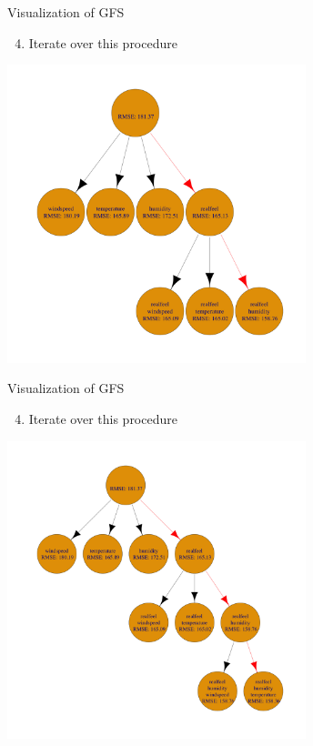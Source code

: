 \documentclass[11pt,compress,t,notes=noshow, xcolor=table]{beamer}
\begin{document}
\begin{frame}[noframenumbering]{Visualization of GFS}    
\begin{enumerate}
    \setcounter{enumi}{3}
    \item Iterate over this procedure
\end{enumerate}
    \begin{center}
      \includegraphics[width = 0.65\textwidth]{figure/fs-wrappers-powerset-tree-2.png}
      \end{center}
\end{frame}

\begin{frame}[noframenumbering]{Visualization of GFS}
\begin{enumerate}
    \setcounter{enumi}{3}
    \item Iterate over this procedure
\end{enumerate}

    \begin{center}
      \includegraphics[width = 0.65\textwidth]{figure/fs-wrappers-powerset-tree-3.png}
    \end{center}
\end{frame}
  
\end{document}
